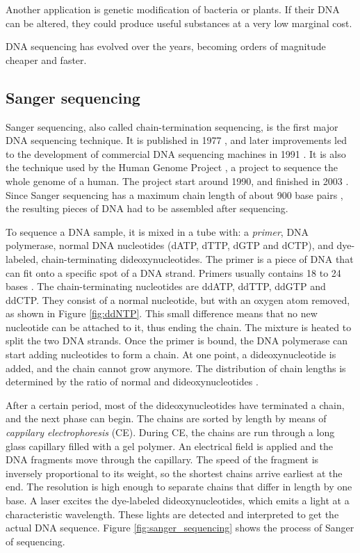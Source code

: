 \documentclass[../main/thesis.tex]{subfiles}
\begin{document}
Another application is genetic modification of bacteria or plants.
If their DNA can be altered, they could produce useful substances at a very low marginal cost.

DNA sequencing has evolved over the years, becoming orders of magnitude cheaper and faster.

\subsection{Sanger sequencing}
Sanger sequencing, also called chain-termination sequencing, is the first major DNA sequencing technique.
It is published in 1977 \cite{Sanger}, and later improvements led to the development of commercial DNA sequencing machines in 1991 \cite{history_sequencing}.
It is also the technique used by the Human Genome Project \cite{sanger_sequencing2}, a project to sequence the whole genome of a human.
The project start around 1990, and finished in 2003 \cite{human_genome_project}.
Since Sanger sequencing has a maximum chain length of about 900 base pairs \cite{sanger_sequencing2}, the resulting pieces of DNA had to be assembled after sequencing.

To sequence a DNA sample, it is mixed in a tube with: a \textit{primer}, DNA polymerase, normal DNA nucleotides (dATP, dTTP, dGTP and dCTP), and dye-labeled, chain-terminating dideoxynucleotides.
The primer is a piece of DNA that can fit onto a specific spot of a DNA strand.
Primers usually contains 18 to 24 bases \cite{sanger_primer_size}.
The chain-terminating nucleotides are ddATP, ddTTP, ddGTP and ddCTP.
They consist of a normal nucleotide, but with an oxygen atom removed, as shown in Figure \ref{fig:ddNTP}.
This small difference means that no new nucleotide can be attached to it, thus ending the chain.
The mixture is heated to split the two DNA strands.
Once the primer is bound, the DNA polymerase can start adding nucleotides to form a chain.
At one point, a dideoxynucleotide is added, and the chain cannot grow anymore.
The distribution of chain lengths is determined by the ratio of normal and dideoxynucleotides \cite{sanger_ratio}.

After a certain period, most of the dideoxynucleotides have terminated a chain, and the next phase can begin.
The chains are sorted by length by means of \textit{cappilary electrophoresis} (CE).
During CE, the chains are run through a long glass capillary filled with a gel polymer.
An electrical field is applied and the DNA fragments move through the capillary.
The speed of the fragment is inversely proportional to its weight, so the shortest chains arrive earliest at the end.
The resolution is high enough to separate chains that differ in length by one base.
A laser excites the dye-labeled dideoxynucleotides, which emits a light at a characteristic wavelength.
These lights are detected and interpreted to get the actual DNA sequence.
Figure \ref{fig:sanger_sequencing} shows the process of Sanger of sequencing.
\end{document}
